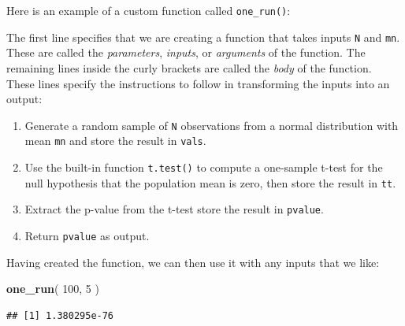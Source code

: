 \documentclass[
]{book}
\newenvironment{Shaded}{\begin{snugshade}}{\end{snugshade}}
\newcommand{\AttributeTok}[1]{\textcolor[rgb]{0.13,0.29,0.53}{#1}}
\newcommand{\ControlFlowTok}[1]{\textcolor[rgb]{0.13,0.29,0.53}{\textbf{#1}}}
\newcommand{\DecValTok}[1]{\textcolor[rgb]{0.00,0.00,0.81}{#1}}
\newcommand{\FunctionTok}[1]{\textcolor[rgb]{0.13,0.29,0.53}{\textbf{#1}}}
\newcommand{\NormalTok}[1]{#1}
\newcommand{\OtherTok}[1]{\textcolor[rgb]{0.56,0.35,0.01}{#1}}
\newcommand{\SpecialCharTok}[1]{\textcolor[rgb]{0.81,0.36,0.00}{\textbf{#1}}}
\providecommand{\tightlist}{%
  \setlength{\itemsep}{0pt}\setlength{\parskip}{0pt}}
\begin{document}
Here is an example of a custom function called \texttt{one\_run()}:

\begin{Shaded}
\end{Shaded}

The first line specifies that we are creating a function that takes inputs \texttt{N} and \texttt{mn}. These are called the \emph{parameters}, \emph{inputs}, or \emph{arguments} of the function. The remaining lines inside the curly brackets are called the \emph{body} of the function. These lines specify the instructions to follow in transforming the inputs into an output:

\begin{enumerate}
\def\labelenumi{\arabic{enumi}.}
\tightlist
\item
  Generate a random sample of \texttt{N} observations from a normal distribution with mean \texttt{mn} and store the result in \texttt{vals}.
\item
  Use the built-in function \texttt{t.test()} to compute a one-sample t-test for the null hypothesis that the population mean is zero, then store the result in \texttt{tt}.
\item
  Extract the p-value from the t-test store the result in \texttt{pvalue}.
\item
  Return \texttt{pvalue} as output.
\end{enumerate}

Having created the function, we can then use it with any inputs that we like:

\begin{Shaded}
\begin{Highlighting}[]
\FunctionTok{one\_run}\NormalTok{( }\DecValTok{100}\NormalTok{, }\DecValTok{5}\NormalTok{ )}
\end{Highlighting}
\end{Shaded}

\begin{verbatim}
## [1] 1.380295e-76
\end{verbatim}
\end{document}
